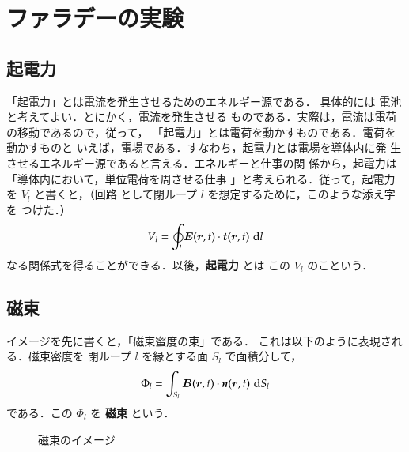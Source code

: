     \section{ファラデーの実験}
    \subsection{起電力}
        「起電力」とは電流を発生させるためのエネルギー源である．
        具体的には 電池 と考えてよい．とにかく，電流を発生させる
        ものである．実際は，電流は電荷の移動であるので，従って，
        「起電力」とは電荷を動かすものである．電荷を動かすものと
        いえば，電場である．すなわち，起電力とは電場を導体内に発
        生させるエネルギー源であると言える．エネルギーと仕事の関
        係から，起電力は「導体内において，単位電荷を周させる仕事
        」と考えられる．従って，起電力を $V_{l}$ と書くと，（回路
        として閉ループ $l$ を想定するために，このような添え字を
        つけた．）
            \begin{align}
                V_{l}=\oint_{l} \boldsymbol{E}(\boldsymbol{r},t)\cdot\boldsymbol{t}(\boldsymbol{r},t) \,\,\mathrm{d} l
            \end{align}
        なる関係式を得ることができる．以後，\textbf{起電力} とは
        この $V_{l}$ のこという．


    \subsection{磁束}
        イメージを先に書くと，「磁束蜜度の束」である．
        これは以下のように表現される．磁束密度を
        閉ループ $l$ を縁とする面 $S_{l}$ で面積分して，
            \begin{align}
                \Phi_{l}=\int_{S_{l}} \boldsymbol{B}(\boldsymbol{r},t)
                \cdot\textit{\textbf{n}}(\boldsymbol{r},t) \,\,\mathrm{d} S_{l}
            \end{align}
        である．この $\Phi_l{}$ を \textbf{磁束} という．
            \begin{figure}[hbt]
                \begin{center}
                    \caption{磁束のイメージ}
                    \label{fig:jisoku_image}
                \end{center}
            \end{figure}

